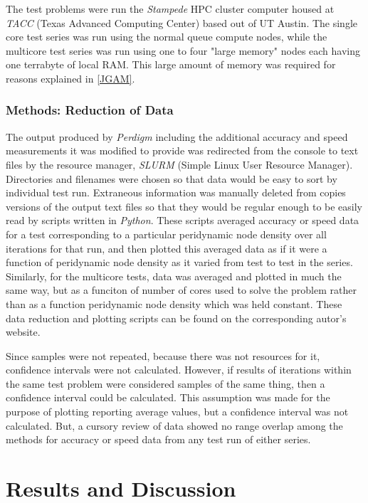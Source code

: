 \documentclass[preprint,12pt]{elsarticle}
\begin{document}
The test problems were run the \emph{Stampede} HPC cluster computer housed at \emph{TACC} (Texas
Advanced Computing Center) based out of UT Austin. The single core test series was run using the
normal queue compute nodes, while the multicore test series was run using one to four "large memory"
nodes each having one terrabyte of local RAM. This large amount of memory was required for reasons
explained in \ref{JGAM}.  

\subsubsection{Methods: Reduction of Data} The output produced by \emph{Perdigm} including the
additional accuracy and speed measurements it was modified to provide was redirected from the
console to text files by the resource manager, \emph{SLURM} (Simple Linux User Resource Manager).
Directories and filenames were chosen so that data would be easy to sort by individual test run.
Extraneous information was manually deleted from copies versions of the output text files so that
they would be regular enough to be easily read by scripts written in \emph{Python}. These scripts
averaged accuracy or speed data for a test corresponding to a particular peridynamic node density
over all iterations for that run, and then plotted this averaged data as if it were a function of
peridynamic node density as it varied from test to test in the series.  Similarly, for the multicore
tests, data was averaged and plotted in much the same way, but as a funciton of number of cores used
to solve the problem rather than as a function peridynamic node density which was held constant.
These data reduction and plotting scripts can be found on the corresponding autor's website.

Since samples were not repeated, because there was not resources for it, confidence intervals were
not calculated. However, if results of iterations within the same test problem were considered
samples of the same thing, then a confidence interval could be calculated. This assumption was made
for the purpose of plotting reporting average values, but a confidence interval was not calculated.
But, a cursory review of data showed no range overlap among the methods for accuracy or speed data
from any test run of either series.

\section{Results and Discussion}
\end{document}
